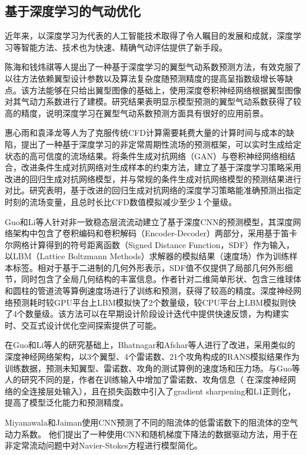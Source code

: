 \subsection{基于深度学习的气动优化}
近年来，以深度学习为代表的人工智能技术取得了令人瞩目的发展和成就，深度学习等智能方法、技术也为快速、精确气动评估提供了新手段。

陈海和钱炜祺等人\cite{陈海2018}提出了一种基于深度学习的翼型气动系数预测方法，有效克服了以往方法依赖翼型设计参数以及算法复杂度随预测精度的提高呈指数级增长等缺点。该方法能够在只给出翼型图像的基础上，使用深度卷积神经网络根据翼型图像对其气动力系数进行了建模。研究结果表明显示模型预测的翼型气动系数获得了较高的精度，说明深度学习在翼型气动系数预测方面具有很好的应用前景。

惠心雨和袁泽龙等人\cite{惠心雨2019}为了克服传统CFD计算需要耗费大量的计算时间与成本的缺陷，提出了一种基于深度学习的非定常周期性流场的预测框架，可以实时生成给定状态的高可信度的流场结果。将条件生成对抗网络（GAN）与卷积神经网络相结合，改进条件生成对抗网络对生成样本的约束方法，建立了基于深度学习策略采用改进的回归生成对抗网络模型，并与常规的条件生成对抗网络模型的预测结果进行对比。研究表明，基于改进的回归生成对抗网络的深度学习策略能准确预测出指定时刻的流场变量，且总时长比CFD数值模拟减少至少１个量级。

Guo和Li等人\cite{DBLP:conf/kdd/GuoLI16}针对非一致稳态层流流动建立了基于深度CNN的预测模型，其深度网络架构中包含了卷积编码和卷积解码（Encoder-Decoder）两部分，采用基于笛卡尔网格计算得到的符号距离函数（Signed Distance Function，SDF）作为输入，以LBM（Lattice Boltzmann Methods）求解器的模拟结果（速度场）作为训练样本标签。相对于基于二进制的几何外形表示，SDF值不仅提供了局部几何外形细节，同时包含了全局几何结构的丰富信息。作者针对二维简单形状、包含三维球体和圆柱的管道流等算例速度场进行了训练和预测，获得了较高的精度。深度神经网络预测耗时较GPU平台上LBM模拟快了2个数量级，较CPU平台上LBM模拟则快了4个数量级。该方法可以在早期设计阶段设计迭代中提供快速反馈，为构建实时、交互式设计优化空间探索提供了可能。

在Guo和Li等人的研究基础上，Bhatnagar和Afshar等人\cite{bhatnagar2019prediction}进行了改进，采用类似的深度神经网络架构，以3个翼型、4个雷诺数、21个攻角构成的RANS模拟结果作为训练数据，预测未知翼型、雷诺数、攻角的测试算例的速度场和压力场。与Guo等人的研究不同的是，作者在训练输入中增加了雷诺数、攻角信息（ 在深度神经网络的全连接层处输入），且在损失函数中引入了gradient sharpening和L1正则化，提高了模型泛化能力和预测精度。

Miyanawala和Jaiman\cite{2017An}使用CNN预测了不同的阻流体的低雷诺数下的阻流体的空气动力系数。 他们提出了一种使用CNN和随机梯度下降法的数据驱动方法，用于在非定常流动问题中对Navier-Stokes方程进行模型简化。

